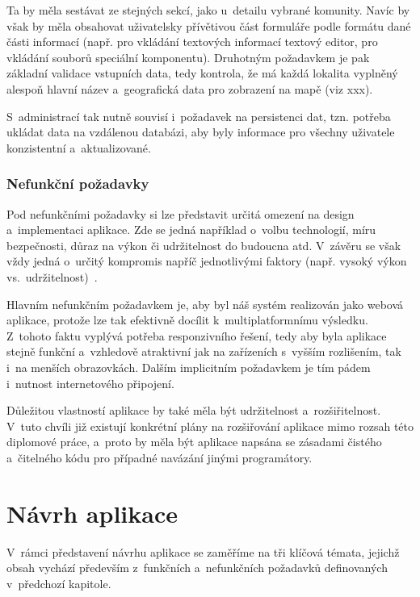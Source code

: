 Ta by měla sestávat ze stejných sekcí, jako u~detailu vybrané komunity. Navíc by však by měla obsahovat uživatelsky přívětivou část formuláře podle formátu dané části informací (např. pro vkládání textových informací textový editor, pro vkládání souborů speciální komponentu). Druhotným požadavkem je pak základní validace vstupních data, tedy kontrola, že má každá lokalita vyplněný alespoň hlavní název a~geografická data pro zobrazení na mapě (viz xxx).

S~administrací tak nutně souvisí i~požadavek na persistenci dat, tzn. potřeba ukládat data na vzdálenou databázi, aby byly informace pro všechny uživatele konzistentní a~aktualizované.

\hypertarget{nefunkux10dnuxed-poux17eadavky}{%
\subsection{Nefunkční požadavky}\label{nefunkux10dnuxed-poux17eadavky}}

Pod nefunkčními požadavky si lze představit určitá omezení na design a~implementaci aplikace. Zde se jedná například o~volbu technologií, míru bezpečnosti, důraz na výkon či udržitelnost do budoucna atd. V~závěru se však vždy jedná o~určitý kompromis napříč jednotlivými faktory (např. vysoký výkon vs.~udržitelnost)~\parencite{Gorton2006}.

Hlavním nefunkčním požadavkem je, aby byl náš systém realizován jako webová aplikace, protože lze tak efektivně docílit k~multiplatformnímu výsledku. Z~tohoto faktu vyplývá potřeba responzivního řešení, tedy aby byla aplikace stejně funkční a~vzhledově atraktivní jak na zařízeních s~vyšším rozlišením, tak i~na menších obrazovkách. Dalším implicitním požadavkem je tím pádem i~nutnost internetového připojení.

Důležitou vlastností aplikace by také měla být udržitelnost a~rozšiřitelnost. V~tuto chvíli již existují konkrétní plány na rozšiřování aplikace mimo rozsah této diplomové práce, a~proto by měla být aplikace napsána se zásadami čistého a~čitelného kódu pro případné navázání jinými programátory.

\hypertarget{nuxe1vrh-aplikace}{%
\chapter{Návrh aplikace}\label{nuxe1vrh-aplikace}}

V~rámci představení návrhu aplikace se zaměříme na tři klíčová témata, jejichž obsah vychází především z~funkčních a~nefunkčních požadavků definovaných v~předchozí kapitole.

